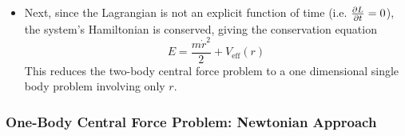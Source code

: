 \documentclass[11pt, a4paper]{article}
\newcommand{\veff}{V_{\text{eff}}}
\begin{document}
\begin{itemize}
	\item Next, since the Lagrangian is not an explicit function of time (i.e. $ \pdv{L}{t} = 0 $), the system's Hamiltonian is conserved, giving the conservation equation
	\begin{equation*}
		E = \frac{m\dot{r}^{2}}{2}  + \veff(r)
	\end{equation*}
	This reduces the two-body central force problem to a one dimensional single body problem involving only $ r $.
	
\end{itemize}


\subsubsection{One-Body Central Force Problem: Newtonian Approach}
\end{document}
